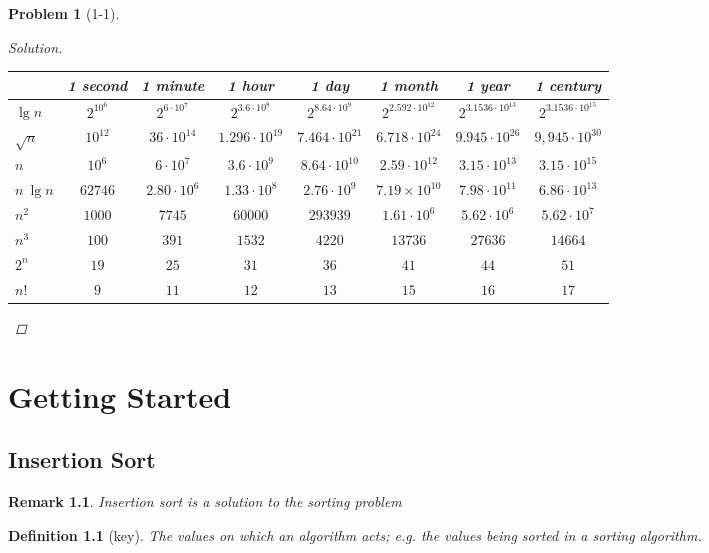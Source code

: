 \documentclass[oneside]{book}
\newtheorem{problem}{Problem}[section]
\newtheorem{definition}{Definition}[chapter]
\newtheorem{rem}{Remark}[chapter]
\begin{document}
\begin{spacing}{1.618}
\begin{problem}[1-1]
\begin{proof}[Solution]
		\begin{tabular}{l|c|c|c|c|c|c|c|}
			 & 1 second & 1 minute & 1 hour & 1 day & 1 month & 1 year & 1 century \\
			 \hline
			 $\lg{n}$ & $2^{10^6}$ & $2^{6\cdot 10^7}$ & $ 2^{3.6 \cdot 10^8}$ & $2^{8.64 \cdot 10^9}$ & $2^{2.592\cdot 10^{12}}$ & $2^{3.1536\cdot 10^{13}}$ & $2^{3.1536 \cdot 10^{15}}$ \\
			 \hline
			 $\sqrt{n}$ & $10^{12}$ & $36 \cdot 10^{14}$ & $1.296 \cdot 10^{19}$ & $7.464\cdot 10^{21}$ & $6.718\cdot 10^{24}$ & $9.945\cdot 10^{26}$ & $9,945\cdot 10^{30}$ \\
			 \hline 
			 $n$ & $10^6$ & $6 \cdot 10^7$ & $3.6\cdot 10^9$ & $8.64\cdot 10^{10}$ & $2.59\cdot 10^{12}$ & $3.15\cdot 10^{13}$ & $3.15\cdot 10^{15}$ \\
			 \hline
			 $n~\lg{n}$ & $62746$ & $2.80\cdot 10^6$ & $1.33\cdot 10^8$ & $2.76\cdot 10^9$ & $7.19\times 10^{10}$ & $7.98\cdot 10^{11}$ & $6.86\cdot 10^{13}$ \\
			 \hline
			 $n^2$ & $1000$ & $7745$ & $60000$ & $293939$ & $1.61\cdot 10^6$ & $5.62\cdot 10^6$ & $5.62\cdot 10^7$ \\
			\hline
			 $n^3$ & $100$ & $391$ & $ 1532$ & $4220$ & $13736$ & $27636$ & $14664$\\
			\hline
			 $2^n$ & $19$ & $25$ & $31$ & $36$ & $41$ & $ 44$ & $ 51$ \\
			\hline
			 $n!$ & $9$ & $11$ & $12$ & $13$ & $15$ & $16$ & $17$\\
			\hline
		\end{tabular}
	\end{proof}
\end{problem}

\chapter{Getting Started}
\section{Insertion Sort}

\begin{rem}
	Insertion sort is a solution to the sorting problem
\end{rem}

\begin{definition}[key]
	The values on which an algorithm acts; e.g. the values being sorted in a sorting algorithm. 
\end{definition}


\end{spacing}
\end{document}
